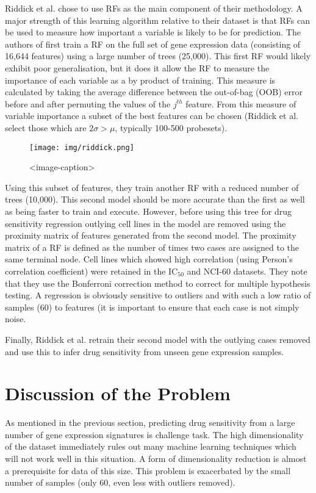 \documentclass[journal]{IEEEtran}
\begin{document}
Riddick et al. chose to use RFs as the main component of their methodology. A major strength of this learning algorithm relative to their dataset is that RFs can be used to measure how important a variable is likely to be for prediction. The authors of \cite{riddick2011predicting} first train a RF on the full set of gene expression data (consisting of 16,644 features) using a large number of trees (25,000). This first RF would likely exhibit poor generalisation, but it does it allow the RF to measure the importance of each variable as a by product of training. This measure is calculated by taking the average difference between the out-of-bag (OOB) error before and after permuting the values of the $j^{th}$ feature. From this measure of variable importance a subset of the best features can be chosen (Riddick et al. select those which are $2 \sigma > \mu$, typically 100-500 probesets).


\begin{figure}[H]
\centering
\texttt{[image: img/riddick.png]}
\caption{<image-caption>}
\label{fig:riddick-diagram}
\end{figure}

Using this subset of features, they train another RF with a reduced number of trees (10,000). This second model should be more accurate than the first as well as being faster to train and execute. However, before using this tree for drug sensitivity regression outlying cell lines in the model are removed using the proximity matrix of features generated from the second model. The proximity matrix of a RF is defined as the number of times two cases are assigned to the same terminal node. Cell lines which showed high correlation (using Person's correlation coefficient) were retained in the IC$_{50}$ and NCI-60 datasets. They note that they use the Bonferroni correction method \cite{abdi2007bonferonni} to correct for multiple hypothesis testing. A regression is obviously sensitive to outliers and with such a low ratio of samples (60) to features (it is important to ensure that each case is not simply noise.

Finally, Riddick et al. retrain their second model with the outlying cases removed and use this to infer drug sensitivity from unseen gene expression samples.

\section{Discussion of the Problem}
\label{sec:problem-discussion}
As mentioned in the previous section, predicting drug sensitivity from a large number of gene expression signatures is challenge task. The high dimensionality of the dataset immediately rules out many machine learning techniques which will not work well in this situation. A form of dimensionality reduction is almost a prerequisite for data of this size. This problem is exacerbated by the small number of samples (only 60, even less with outliers removed).
\end{document}
